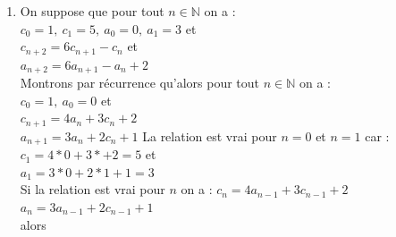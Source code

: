 \documentclass[a4paper,11pt]{book}
\newcommand{\N}{{\mathbb{N}}}
\begin{document}
\begin{enumerate}
{\tt normal(linsolve([x+y=1/2,x*r1+y*r2=7/2],[x,y]))}\\
On obtient :\\
{\tt [(-(sqrt(2))+1)/4,(sqrt(2)+1)/4]}\\
On a donc :\\
$u_n=\frac{1-\sqrt 2}{4}*(-2*\sqrt 2+3)^n+\frac{1+\sqrt 2}{4}*(2*\sqrt 2+3)^n$\\
Donc :
$$a_n=-\frac{1}{2}+\frac{1-\sqrt 2}{4}*(-2*\sqrt 2+3)^n+\frac{1+\sqrt 2}{4}*(2*\sqrt 2+3)^n$$
On tape :\\
{\tt c(n):=((-sqrt(2)+2)/4)*(-2*sqrt(2)+3)\verb|^|n+\\ ((sqrt(2)+2)/4)*(2*sqrt(2)+3)\verb|^|n}\\
{\tt a(n):=((-sqrt(2)+1)/4)*(-2*sqrt(2)+3)\verb|^|n+\\ ((sqrt(2)+1)/4)*(2*sqrt(2)+3)\verb|^|n-1/2}\\
{\tt normal(a(5),a(5)+1,c(5))}\\
On obtient :\\
{\tt 4059,4060,5741}\\
On tape :\\
{\tt normal(a(6),a(6)+1,c(6))}\\
On obtient :\\
{\tt 23660,23661,33461}\\
On tape :\\
{\tt normal(a(10),a(10)+1,c(10))}\\
On obtient :\\
{\tt 27304196,27304197,38613965}
\item On suppose que pour tout $n \in \N$ on a :\\
$c_0=1,\ c_1=5,\ a_0=0,\ a_1=3$ et\\
$c_{n+2}=6c_{n+1}-c_n$ et\\
$a_{n+2}=6a_{n+1}-a_n+2$\\
Montrons par r\'ecurrence qu'alors pour tout $n \in \N$ on a :\\
$c_0=1,\ a_0=0$ et\\
$c_{n+1}=4a_n+3c_n+2$\\
$a_{n+1}=3a_n+2c_n+1$
La relation est vrai pour $n=0$ et $n=1$ car :\\
$c_1=4*0+3*+2=5$ et\\ 
$a_1=3*0+2*1+1=3$\\
Si la relation est vrai pour $n$ on a :
$c_n=4a_{n-1}+3c_{n-1}+2$\\
$a_n=3a_{n-1}+2c_{n-1}+1$\\
alors \\

\end{enumerate}
\end{document}
